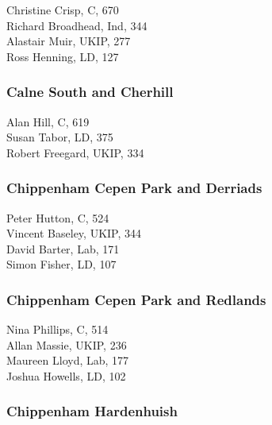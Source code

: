 \documentclass[a4paper,openany,10pt]{book}
\begin{document}


Christine Crisp, C, 670\\
Richard Broadhead, Ind, 344\\
Alastair Muir, UKIP, 277\\
Ross Henning, LD, 127\\


\subsubsection*{Calne South and Cherhill}



Alan Hill, C, 619\\
Susan Tabor, LD, 375\\
Robert Freegard, UKIP, 334\\


\subsubsection*{Chippenham Cepen Park and Derriads}



Peter Hutton, C, 524\\
Vincent Baseley, UKIP, 344\\
David Barter, Lab, 171\\
Simon Fisher, LD, 107\\


\subsubsection*{Chippenham Cepen Park and Redlands}



Nina Phillips, C, 514\\
Allan Massie, UKIP, 236\\
Maureen Lloyd, Lab, 177\\
Joshua Howells, LD, 102\\


\subsubsection*{Chippenham Hardenhuish}
\end{document}
